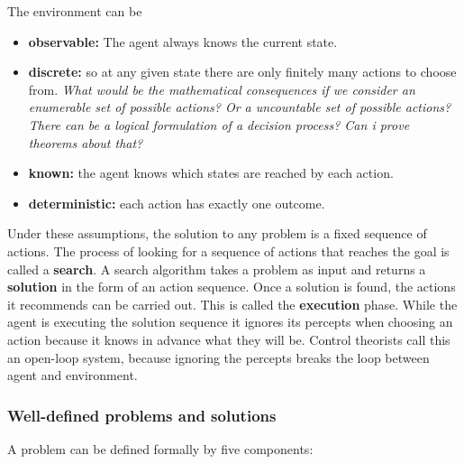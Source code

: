 \documentclass{article}
\begin{document}
The environment can be 

\begin{itemize}
    \item \textbf{observable:} The agent always knows the current state.
    \item \textbf{discrete:} so at any given state there are only finitely many actions to choose from. \textit{What would be the mathematical consequences if we consider an enumerable set of possible actions? Or a uncountable set of possible actions? There can be a logical formulation of a decision process? Can i prove theorems about that?}
    \item \textbf{known:} the agent knows which states are reached by each action.
    \item \textbf{deterministic:} each action has exactly one outcome.
\end{itemize}

Under these assumptions, the solution to any problem is a fixed sequence of actions. The process of looking for a sequence of actions that reaches the goal is called a \textbf{search}. A search algorithm takes a problem as input and returns a \textbf{solution} in the form of an action sequence. Once a solution is found, the actions it recommends can be carried out. This is called the \textbf{execution} phase. While the agent is executing the solution sequence it ignores its percepts when choosing an action because it knows in advance what they will be. Control theorists call this an open-loop system, because ignoring the percepts breaks the loop between agent and environment.

\subsubsection{Well-defined problems and solutions}

A problem can be defined formally by five components:
\end{document}
